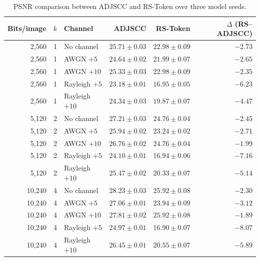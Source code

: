 \documentclass[letterpaper,journal]{IEEEtran}
\begin{document}
\begin{table}[!t]
\centering
\caption{PSNR comparison between ADJSCC and RS-Token over three model seeds.}
\scriptsize
\begin{tabular}{@{}rrlrrr@{}}
\toprule
Bits/image & $k$ & Channel & ADJSCC & RS-Token & $\Delta$ (RS--ADJSCC) \\ \midrule
2,560 & 1 & No channel & $25.71\pm0.03$ & $22.98\pm0.09$ & $-2.73$ \\
2,560 & 1 & AWGN $+5$ & $24.64\pm0.02$ & $21.99\pm0.07$ & $-2.65$ \\
2,560 & 1 & AWGN $+10$ & $25.33\pm0.03$ & $22.98\pm0.09$ & $-2.35$ \\
2,560 & 1 & Rayleigh $+5$ & $23.18\pm0.01$ & $16.95\pm0.05$ & $-6.23$ \\
2,560 & 1 & Rayleigh $+10$ & $24.34\pm0.03$ & $19.87\pm0.07$ & $-4.47$ \\
5,120 & 2 & No channel & $27.21\pm0.03$ & $24.76\pm0.04$ & $-2.45$ \\
5,120 & 2 & AWGN $+5$ & $25.94\pm0.02$ & $23.24\pm0.02$ & $-2.71$ \\
5,120 & 2 & AWGN $+10$ & $26.76\pm0.02$ & $24.76\pm0.04$ & $-1.99$ \\
5,120 & 2 & Rayleigh $+5$ & $24.10\pm0.01$ & $16.94\pm0.06$ & $-7.16$ \\
5,120 & 2 & Rayleigh $+10$ & $25.47\pm0.02$ & $20.33\pm0.07$ & $-5.14$ \\
10,240 & 4 & No channel & $28.23\pm0.03$ & $25.92\pm0.08$ & $-2.30$ \\
10,240 & 4 & AWGN $+5$ & $27.06\pm0.01$ & $23.94\pm0.09$ & $-3.12$ \\
10,240 & 4 & AWGN $+10$ & $27.81\pm0.02$ & $25.92\pm0.08$ & $-1.89$ \\
10,240 & 4 & Rayleigh $+5$ & $24.97\pm0.01$ & $16.90\pm0.07$ & $-8.07$ \\
10,240 & 4 & Rayleigh $+10$ & $26.45\pm0.01$ & $20.55\pm0.07$ & $-5.89$ \\ \bottomrule
\end{tabular}
\end{table}
\end{document}
